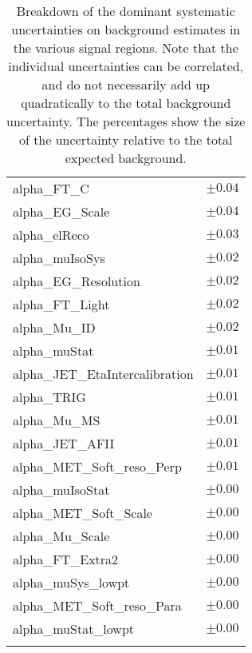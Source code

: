 \begin{table}
\begin{center}
\begin{tabular*}{\textwidth}{@{\extracolsep{\fill}}lc}
alpha\_FT\_C         & $\pm 0.04$       \\
alpha\_EG\_Scale         & $\pm 0.04$       \\
alpha\_elReco         & $\pm 0.03$       \\
alpha\_muIsoSys         & $\pm 0.02$       \\
alpha\_EG\_Resolution         & $\pm 0.02$       \\
alpha\_FT\_Light         & $\pm 0.02$       \\
alpha\_Mu\_ID         & $\pm 0.02$       \\
alpha\_muStat         & $\pm 0.01$       \\
alpha\_JET\_EtaIntercalibration         & $\pm 0.01$       \\
alpha\_TRIG         & $\pm 0.01$       \\
alpha\_Mu\_MS         & $\pm 0.01$       \\
alpha\_JET\_AFII         & $\pm 0.01$       \\
alpha\_MET\_Soft\_reso\_Perp         & $\pm 0.01$       \\
alpha\_muIsoStat         & $\pm 0.00$       \\
alpha\_MET\_Soft\_Scale         & $\pm 0.00$       \\
alpha\_Mu\_Scale         & $\pm 0.00$       \\
alpha\_FT\_Extra2         & $\pm 0.00$       \\
alpha\_muSys\_lowpt         & $\pm 0.00$       \\
alpha\_MET\_Soft\_reso\_Para         & $\pm 0.00$       \\
alpha\_muStat\_lowpt         & $\pm 0.00$       \\
\noalign{\smallskip}\hline\noalign{\smallskip}
\end{tabular*}
\end{center}
\caption[Breakdown of uncertainty on background estimates]{
Breakdown of the dominant systematic uncertainties on background estimates in the various signal regions.
Note that the individual uncertainties can be correlated, and do not necessarily add up quadratically to 
the total background uncertainty. The percentages show the size of the uncertainty relative to the total expected background.
\label{table.results.bkgestimate.uncertainties.SR1b}}
\end{table}
%